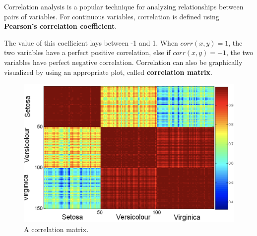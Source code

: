Correlation analysis is a popular technique for analyzing relationships between pairs of variables. For continuous variables, correlation is defined using \textbf{Pearson's correlation coefficient}.


The value of this coefficient lays between -1 and 1. When $\textit{corr}(x,y) = 1$, the two variables have a perfect positive correlation, else if $\textit{corr}(x,y) = -1$, the two variables have perfect negative correlation. Correlation can also be graphically visualized by using an appropriate plot, called \textbf{correlation matrix}.

\begin{figure}[h]
    \centering
    \includegraphics[width=0.4\linewidth]{img/correlation matrix.png}
    \caption{A correlation matrix.}
\end{figure}